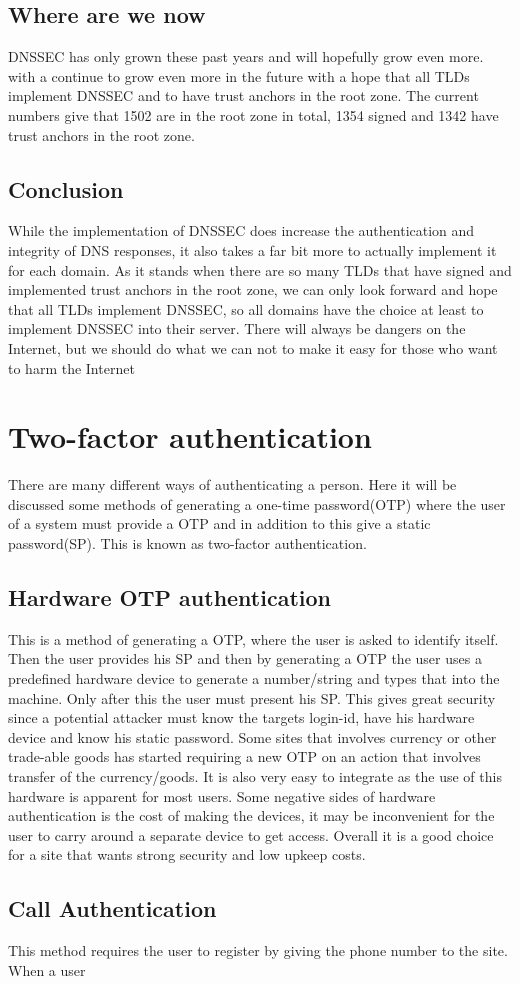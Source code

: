 \documentclass{article}
\begin{document}
        \subsection{Where are we now}
		DNSSEC has only grown these past years and will hopefully grow even more. with a continue to grow even more in the future with a hope that all TLDs implement DNSSEC and to have trust anchors in the root zone. The current numbers give that 1502 are in the root zone in total, 1354 signed and 1342 have trust anchors in the root zone.\cite{icannStats}
		\subsection{Conclusion}
		While the implementation of DNSSEC does increase the authentication and integrity of DNS responses, it also takes a far bit more to actually implement it for each domain. As it stands when there are so many TLDs that have signed and implemented trust anchors in the root zone, we can only look forward and hope that all TLDs implement DNSSEC, so all domains have the choice at least to implement DNSSEC into their server.
	    There will always be dangers on the Internet, but we should do what we can not to make it easy for those who want to harm the Internet
	\section{Two-factor authentication}
	There are many different ways of authenticating a person. Here it will be discussed some methods of generating a one-time password(OTP) where the user of a system must provide a OTP and in addition to this give a static password(SP). This is known as two-factor authentication. 
		\subsection{Hardware OTP authentication}
		This is a method of generating a OTP, where the user is asked to identify itself. Then the user provides his SP and then by generating a OTP the user uses a predefined hardware device to generate a number/string and types that into the machine. Only after this the user must present his SP. 
		This gives great security since a potential attacker must know the targets login-id, have his hardware device and know his static password. Some sites that involves currency or other trade-able goods has started requiring a new OTP on an action that involves transfer of the currency/goods. It is also very easy to integrate as the use of this hardware is apparent for most users. Some negative sides of hardware authentication is the cost of making the devices, it may be inconvenient for the user to carry around a separate device to get access. Overall it is a good choice for a site that wants strong security and low upkeep costs.
		\subsection{Call Authentication}
		This method requires the user to register by giving the phone number to the site. When a user		
		
        
    \clearpage
	\nocite{*}
	
	
\end{document}
